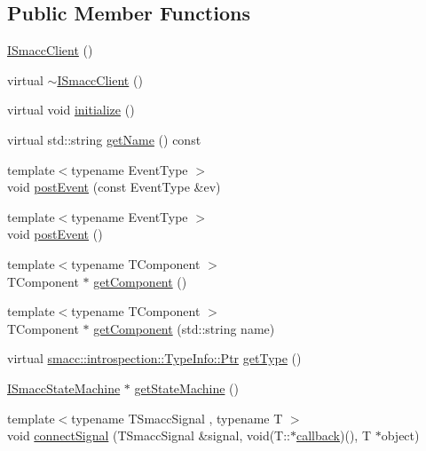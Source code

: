 \subsection*{Public Member Functions}
\begin{DoxyCompactItemize}
\item 
\hyperlink{classsmacc_1_1ISmaccClient_a40222ad8b9b7962755434025b1fd5ae7}{I\+Smacc\+Client} ()
\item 
virtual \hyperlink{classsmacc_1_1ISmaccClient_a030e17771bf2e404a6fad97273c4d7f4}{$\sim$\+I\+Smacc\+Client} ()
\item 
virtual void \hyperlink{classsmacc_1_1ISmaccClient_a974ebb6ad6cf812e7b9de6b78b3d901f}{initialize} ()
\item 
virtual std\+::string \hyperlink{classsmacc_1_1ISmaccClient_a8c3ce19f182e71909c5dc6263d25be69}{get\+Name} () const
\item 
{\footnotesize template$<$typename Event\+Type $>$ }\\void \hyperlink{classsmacc_1_1ISmaccClient_a46cbc0d695214efe40d29247323bfc80}{post\+Event} (const Event\+Type \&ev)
\item 
{\footnotesize template$<$typename Event\+Type $>$ }\\void \hyperlink{classsmacc_1_1ISmaccClient_a21a79203cb44fc717d4d977c190327c6}{post\+Event} ()
\item 
{\footnotesize template$<$typename T\+Component $>$ }\\T\+Component $\ast$ \hyperlink{classsmacc_1_1ISmaccClient_adef78db601749ca63c19e74a27cb88cc}{get\+Component} ()
\item 
{\footnotesize template$<$typename T\+Component $>$ }\\T\+Component $\ast$ \hyperlink{classsmacc_1_1ISmaccClient_ad72cba3ce7c5b3bd3977747dc6d5fb69}{get\+Component} (std\+::string name)
\item 
virtual \hyperlink{classsmacc_1_1introspection_1_1TypeInfo_aa6ffd9c39811d59f7c771941b7fad860}{smacc\+::introspection\+::\+Type\+Info\+::\+Ptr} \hyperlink{classsmacc_1_1ISmaccClient_ae7faf4e40510c73810e6b0ef9fec8f33}{get\+Type} ()
\item 
\hyperlink{classsmacc_1_1ISmaccStateMachine}{I\+Smacc\+State\+Machine} $\ast$ \hyperlink{classsmacc_1_1ISmaccClient_aec51d4712404cb9882b86e4c854bb93a}{get\+State\+Machine} ()
\item 
{\footnotesize template$<$typename T\+Smacc\+Signal , typename T $>$ }\\void \hyperlink{classsmacc_1_1ISmaccClient_addce4ebcdebc5a7a3f80c0980862575d}{connect\+Signal} (T\+Smacc\+Signal \&signal, void(T\+::$\ast$\hyperlink{sm__ridgeback__barrel__search__2_2servers_2opencv__perception__node_2opencv__perception__node_8cpp_a050e697bd654facce10ea3f6549669b3}{callback})(), T $\ast$object)

\end{DoxyCompactItemize}

